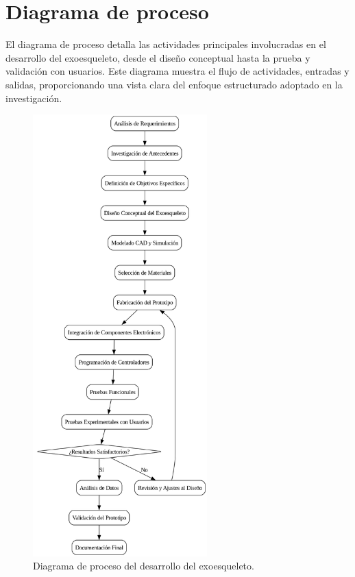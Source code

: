 \section{Diagrama de proceso}
El diagrama de proceso detalla las actividades principales involucradas en el desarrollo del exoesqueleto, desde el diseño conceptual hasta la prueba y validación con usuarios. Este diagrama muestra el flujo de actividades, entradas y salidas, proporcionando una vista clara del enfoque estructurado adoptado en la investigación.
\begin{figure}[H]
    \centering
    \includegraphics[width=0.6\textwidth]{img/Proceso.png}
    \caption{Diagrama de proceso del desarrollo del exoesqueleto.}
    \label{fig:flowchart}
\end{figure}

